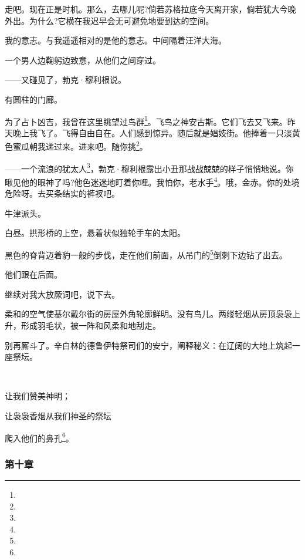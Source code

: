 \par 走吧。现在正是时机。那么，去哪儿呢?倘若苏格拉底今天离开家，倘若犹大今晚外出。为什么?它横在我迟早会无可避免地要到达的空间。
\par 我的意志。与我遥遥相对的是他的意志。中间隔着汪洋大海。
\par 一个男人边鞠躬边致意，从他们之间穿过。
\par ——又碰见了，勃克·穆利根说。
\par 有圆柱的门廊。
\par 为了占卜凶吉，我曾在这里眺望过鸟群\footnote{}。飞鸟之神安古斯。它们飞去又飞来。昨天晚上我飞了。飞得自由自在。人们感到惊异。随后就是娼妓街。他捧着一只淡黄色蜜瓜朝我递过来。进来吧。随你挑\footnote{}。
\par ——一个流浪的犹太人\footnote{}，勃克·穆利根露出小丑那战战兢兢的样子悄悄地说。你瞅见他的眼神了吗?他色迷迷地盯着你哩。我怕你，老水手\footnote{}。哦，金赤。你的处境危险呀。去买条结实的裤衩吧。
\par 牛津派头。
\par 白昼。拱形桥的上空，悬着状似独轮手车的太阳。
\par 黑色的脊背迈着豹一般的步伐，走在他们前面，从吊门的\footnote{}倒刺下边钻了出去。
\par 他们跟在后面。
\par 继续对我大放厥词吧，说下去。
\par 柔和的空气使基尔戴尔街的房屋外角轮廓鲜明。没有鸟儿。两缕轻烟从房顶袅袅上升，形成羽毛状，被一阵和风柔和地刮走。
\par 别再厮斗了。辛白林的德鲁伊特祭司们的安宁，阐释秘义：在辽阔的大地上筑起一座祭坛。
\par  
\par 让我们赞美神明；
\par 让袅袅香烟从我们神圣的祭坛
\par 爬入他们的鼻孔\footnote{}。



\subsubsection*{第十章}


